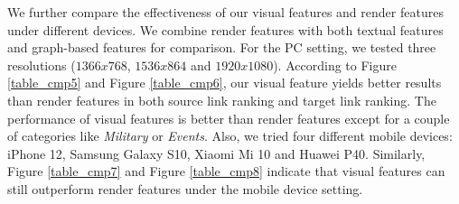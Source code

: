 We further compare the effectiveness of our visual features and render features under different devices. We combine render features with both textual features and graph-based features for comparison. For the PC setting, we tested three resolutions ($1366x768$, $1536x864$ and $1920x1080$). According to Figure \ref{table_cmp5} and Figure \ref{table_cmp6}, our visual feature yields better results than render features in both source link ranking and target link ranking. The performance of visual features is better than render features except for a couple of categories like \emph{Military} or \emph{Events}. Also, we tried four different mobile devices: iPhone 12, Samsung Galaxy S10, Xiaomi Mi 10 and Huawei P40. Similarly, Figure \ref{table_cmp7} and Figure \ref{table_cmp8} indicate that visual features can still outperform render features under the mobile device setting.

